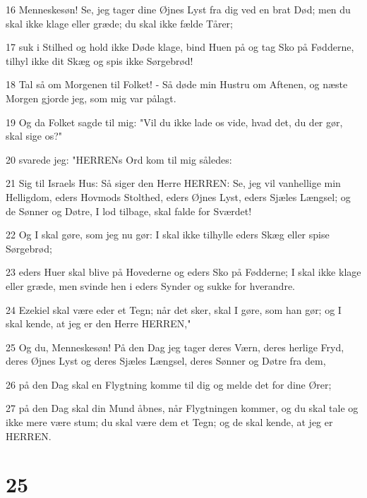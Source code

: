 \par 16 Menneskesøn! Se, jeg tager dine Øjnes Lyst fra dig ved en brat Død; men du skal ikke klage eller græde; du skal ikke fælde Tårer;
\par 17 suk i Stilhed og hold ikke Døde klage, bind Huen på og tag Sko på Fødderne, tilhyl ikke dit Skæg og spis ikke Sørgebrød!
\par 18 Tal så om Morgenen til Folket! - Så døde min Hustru om Aftenen, og næste Morgen gjorde jeg, som mig var pålagt.
\par 19 Og da Folket sagde til mig: "Vil du ikke lade os vide, hvad det, du der gør, skal sige os?"
\par 20 svarede jeg: "HERRENs Ord kom til mig således:
\par 21 Sig til Israels Hus: Så siger den Herre HERREN: Se, jeg vil vanhellige min Helligdom, eders Hovmods Stolthed, eders Øjnes Lyst, eders Sjæles Længsel; og de Sønner og Døtre, I lod tilbage, skal falde for Sværdet!
\par 22 Og I skal gøre, som jeg nu gør: I skal ikke tilhylle eders Skæg eller spise Sørgebrød;
\par 23 eders Huer skal blive på Hovederne og eders Sko på Fødderne; I skal ikke klage eller græde, men svinde hen i eders Synder og sukke for hverandre.
\par 24 Ezekiel skal være eder et Tegn; når det sker, skal I gøre, som han gør; og I skal kende, at jeg er den Herre HERREN,"
\par 25 Og du, Menneskesøn! På den Dag jeg tager deres Værn, deres herlige Fryd, deres Øjnes Lyst og deres Sjæles Længsel, deres Sønner og Døtre fra dem,
\par 26 på den Dag skal en Flygtning komme til dig og melde det for dine Ører;
\par 27 på den Dag skal din Mund åbnes, når Flygtningen kommer, og du skal tale og ikke mere være stum; du skal være dem et Tegn; og de skal kende, at jeg er HERREN.

\chapter{25}

